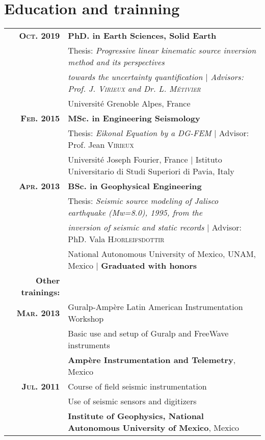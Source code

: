 \documentclass[a4paper,10.5pt]{article} %
\begin{document}
\vskip 0.5cm
\section{Education and trainning}

\begin{tabular}{rl}	
{\bf \textsc{Oct.} 2019} & {\bf PhD. in Earth Sciences, Solid Earth} \\
& Thesis: \emph{Progressive linear kinematic source inversion method and its perspectives} \\
& \emph{towards the uncertainty quantification $|$ \small Advisors: Prof. J. \textsc{Virieux} and Dr. L. \textsc{M\'etivier}}\\
& \small{Universit\'e Grenoble Alpes, France}\\[0.6em]


{\bf \textsc{Feb.} 2015} & {\bf MSc. in Engineering Seismology} \\
& Thesis: \emph{Eikonal Equation by a DG-FEM} $|$ \small Advisor: Prof. Jean \textsc{Virieux}\\
& \small{Universit\'e Joseph Fourier, France $|$ Istituto Universitario di Studi Superiori di Pavia, Italy}\\[0.6em]

{\bf \textsc{Apr.} 2013} & {\bf BSc. in Geophysical Engineering} \\
& Thesis: \emph{Seismic source modeling of Jalisco earthquake (Mw=8.0), 1995, from the} \\
& \emph{inversion of seismic and static records} $|$ \small Advisor: PhD. Vala \textsc{Hjorleifsdottir}\\
& \small{National Autonomous University of Mexico, UNAM, Mexico} $|$ \bf{Graduated with honors} \\[0.8em]

{\bf Other trainings:}\\[0.6em]
{\bf \textsc{Mar.} 2013} & Guralp-Amp\`ere Latin American Instrumentation Workshop\\
& Basic use and setup of Guralp and FreeWave instruments\\
& \small\textbf{Amp\`ere Instrumentation and Telemetry}, Mexico\\[0.6em]

{\bf \textsc{Jul.} 2011} & Course of field seismic instrumentation\\
& Use of seismic sensors and digitizers\\
& \small\textbf{Institute of Geophysics, National Autonomous University of Mexico}, Mexico\\
\end{tabular}
\end{document}
